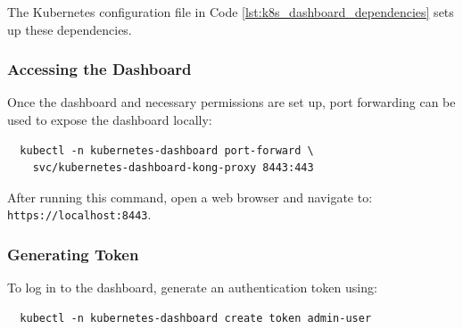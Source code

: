 The Kubernetes configuration file in Code \ref{lst:k8s_dashboard_dependencies} sets up these dependencies.


\subsubsection{Accessing the Dashboard}
Once the dashboard and necessary permissions are set up, port forwarding can be used to expose the dashboard locally:
\begin{verbatim}
  kubectl -n kubernetes-dashboard port-forward \
    svc/kubernetes-dashboard-kong-proxy 8443:443
\end{verbatim}

After running this command, open a web browser and navigate to: \texttt{https://localhost:8443}.

\subsubsection{Generating Token}
To log in to the dashboard, generate an authentication token using:
\begin{verbatim}
  kubectl -n kubernetes-dashboard create token admin-user
\end{verbatim}
